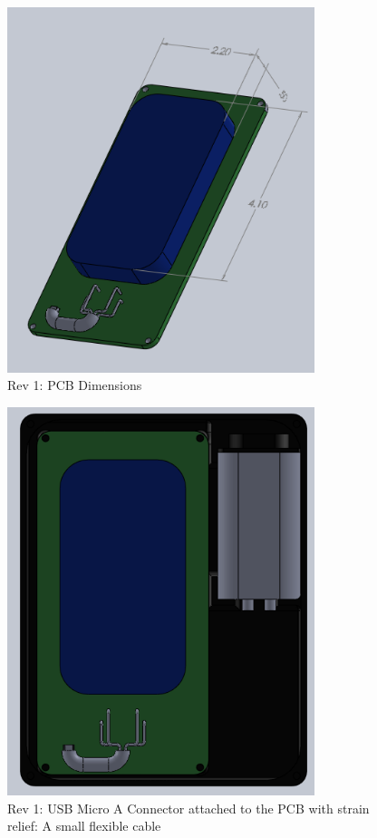 \documentclass{article}
\numberwithin{figure}{section}
\numberwithin{equation}{section}
\begin{document}
{\begin{figure}[H]
	\centering
	\includegraphics[width=0.8\textwidth]{PhoneAndPCB}
	\caption{Rev 1: PCB Dimensions}
	\label{fig:append_pcbphone}
\end{figure}

\begin{figure}[H]
	\centering
	\includegraphics[width=0.8\textwidth]{Assembly1}
	\caption{Rev 1: USB Micro A Connector attached to the PCB with strain relief: A small flexible cable}
	\label{fig:append_usbcable}
\end{figure}

}
\end{document}

